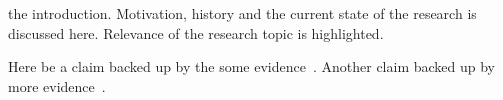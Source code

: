  the introduction. Motivation, history and the current state of the research is discussed here. Relevance of the research topic is highlighted.

Here be a claim backed up by the some evidence~\cite{Allman99}.
Another claim backed up by more evidence~\cite{Ningning03}.